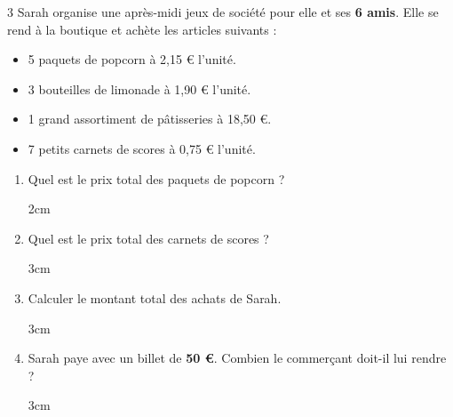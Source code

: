 \documentclass[a4paper]{book}
\begin{document}
{    \begin{exerciceNote}{3}
        Sarah organise une après-midi jeux de société pour elle et ses \textbf{6 amis}. 
        Elle se rend à la boutique et achète les articles suivants :
        
        \begin{itemize}
            \item 5 paquets de popcorn à 2,15 € l'unité.
            \item 3 bouteilles de limonade à 1,90 € l'unité.
            \item 1 grand assortiment de pâtisseries à 18,50 €.
            \item 7 petits carnets de scores à 0,75 € l'unité.
        \end{itemize}
        
        \medskip
        
        \begin{enumerate}[leftmargin=*]
            \item Quel est le prix total des paquets de popcorn ?  
            
            \begin{ZoneReponse}{2cm}
            \end{ZoneReponse}


\newpage

                 
            \item Quel est le prix total des carnets de scores ?    
            
            \begin{ZoneReponse}{3cm}
            \end{ZoneReponse}
                
            \item Calculer le montant total des achats de Sarah. 
            
            \begin{ZoneReponse}{3cm}
            \end{ZoneReponse}

            \item Sarah paye avec un billet de \textbf{50 €}. Combien le commerçant doit-il lui rendre ?
            
            \begin{ZoneReponse}{3cm}
            \end{ZoneReponse}
        \end{enumerate}
    \end{exerciceNote}


}
\end{document}
